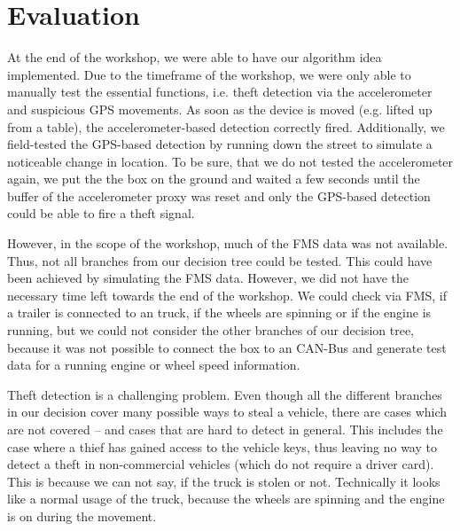 \chapter{Evaluation}

At the end of the workshop, we were able to have our algorithm idea implemented. Due to the timeframe of the workshop, we were only able to manually test the essential functions, i.e. theft detection via the accelerometer and suspicious GPS movements. As soon as the device is moved (e.g. lifted up from a table), the accelerometer-based detection correctly fired. Additionally, we field-tested the GPS-based detection by running down the street to simulate a noticeable change in location. To be sure, that we do not tested the accelerometer again, we put the the box on the ground and waited a few seconds until the buffer of the accelerometer proxy was reset and only the GPS-based detection could be able to fire a theft signal. 

However, in the scope of the workshop, much of the FMS data was not available. Thus, not all branches from our decision tree could be tested. This could have been achieved by simulating the FMS data. However, we did not have the necessary time left towards the end of the workshop. We could check via FMS, if a trailer is connected to an truck, if the wheels are spinning or if the engine is running, but we could not consider the other branches of our decision tree, because it was not possible to connect the box to an CAN-Bus and generate test data for a running engine or wheel speed information. 

Theft detection is a challenging problem. Even though all the different branches in our decision cover many possible ways to steal a vehicle, there are cases which are not covered -- and cases that are hard to detect in general. This includes the case where a thief has gained access to the vehicle keys, thus leaving no way to detect a theft in non-commercial vehicles (which do not require a driver card). This is because we can not say, if the truck is stolen or not. Technically it looks like a normal usage of the truck, because the wheels are spinning and the engine is on during the movement.


\clearpage
